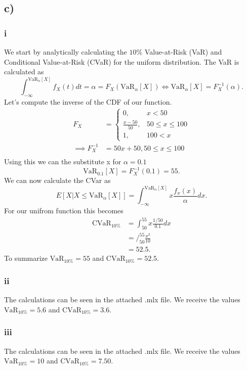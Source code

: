 \documentclass{article}
\begin{document}
\subsection{c)}
\subsubsection{i}
	We start by analytically calculating the $10\%$ Value-at-Risk (VaR) and Conditional Value-at-Risk (CVaR)  for the uniform distribution. The VaR is calculated as 
	\begin{equation}
		\int_{-\infty}^{\text{VaR}_\alpha [X]} f_X(t)dt = \alpha = F_X(\text{VaR}_{\alpha}[X]) \iff \text{VaR}_\alpha [X] =  F_X^{-1}(\alpha).
	\end{equation}
	Let's compute the inverse of the CDF of our function.
	\begin{align}
		F_X &= 
		\begin{cases}
			0 , & x < 50 \\
			 \frac{x-50}{50}, &  50 \leq x \leq 100 \\
			1, & 100 < x
		\end{cases} \\
		\implies F^{-1}_X &= 
			50x + 50,   50 \leq x \leq 100 \\
	\end{align}
	Using this we can the substitute x for $\alpha = 0.1$
	\begin{equation}
		\text{VaR}_{0.1} [X] = F^{-1}_X(0.1) = 55.
	\end{equation}
	We can now calculate the CVar as 
	\begin{equation}
		E[X | X \leq \text{VaR}_\alpha [X]] = \int_{-\infty}^{\text{VaR}_\alpha [X]} x \frac{f_x(x)}{\alpha} dx.
	\end{equation} 
	For our unifrom function this becomes
	\begin{align}
		\text{CVaR}_{10\%} &=  \int_{50}^{55} x \frac{1/50}{0.1} dx \\
		 & = \Bigg/_{50}^{55} \frac{x^2}{10} \\
		 & =  52.5.
	\end{align}
	To summarize $\text{VaR}_{10\%}=55$ and $\text{CVaR}_{10\%}=52.5$.
\subsubsection{ii}
	The calculations can be seen in the attached .mlx file. We receive the values $\text{VaR}_{10\%} = 5.6$ and $\text{CVaR}_{10\%} = 3.6$.
\subsubsection{iii}
	The calculations can be seen in the attached .mlx file. We receive the values $\text{VaR}_{10\%} = 10$ and $\text{CVaR}_{10\%} = 7.50$.
\end{document}
